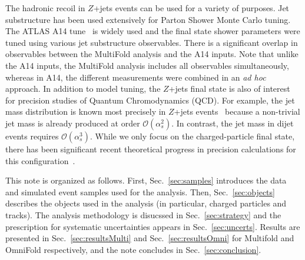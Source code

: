 The hadronic recoil in $Z$+jets events can be used for a variety of purposes.  Jet substructure has been used extensively for Parton Shower Monte Carlo tuning.  The ATLAS A14 tune~\cite{ATL-PHYS-PUB-2014-021} is widely used and the final state shower parameters were tuned using various jet substructure observables.  There is a significant overlap in observables between the MultiFold analysis and the A14 inputs.  Note that unlike the A14 inputs, the MultiFold analysis includes all observables simultaneously, whereas in A14, the different measurements were combined in an \textit{ad hoc} approach.   In addition to model tuning, the $Z$+jets final state is also of interest for precision studies of Quantum Chromodynamics (QCD).  For example, the jet mass distribution is known most precisely in $Z$+jets events~\cite{Frye:2016okc,Frye:2016aiz} because a non-trivial jet mass is already produced at order $\mathcal{O}(\alpha_s^2)$.  In contrast, the jet mass in dijet events requires $\mathcal{O}(\alpha_s^3)$.  While we only focus on the charged-particle final state, there has been significant recent theoretical progress in precision calculations for this configuration~\cite{Chang:2013rca,Chang:2013iba,Li:2021zcf}. 

This note is organized as follows.  First, Sec.~\ref{sec:samples} introduces the data and simulated event samples used for the analysis.  Then, Sec.~\ref{sec:objects} describes the objects used in the analysis (in particular, charged particles and tracks).  The analysis methodology is disucssed in Sec.~\ref{sec:strategy} and the prescription for systematic uncertainties appears in Sec.~\ref{sec:uncerts}.  Results are presented in Sec.~\ref{sec:resultsMulti} and Sec.~\ref{sec:resultsOmni} for Multifold and OmniFold respectively, and the note concludes in Sec.~\ref{sec:conclusion}.
